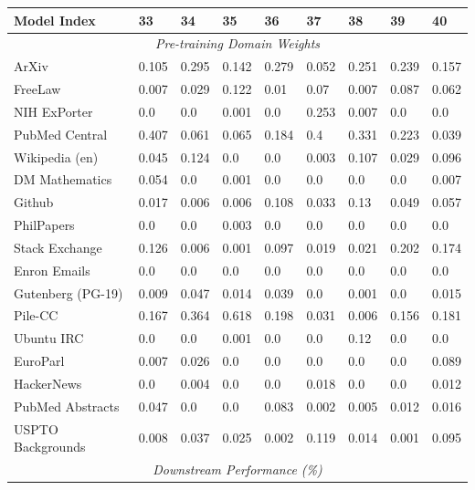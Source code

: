 \begin{table}[!ht]
    \centering
    \begin{tabular}{lllllllll}
    \toprule
        \textbf{Model Index} & \textbf{33} & \textbf{34} & \textbf{35} & \textbf{36} & \textbf{37} & \textbf{38} & \textbf{39} & \textbf{40} \\ \midrule
        \multicolumn{9}{c}{\textit{Pre-training Domain Weights}} \\
        ArXiv & 0.105 & 0.295 & 0.142 & 0.279 & 0.052 & 0.251 & 0.239 & 0.157 \\ 
        FreeLaw & 0.007 & 0.029 & 0.122 & 0.01 & 0.07 & 0.007 & 0.087 & 0.062 \\ 
        NIH ExPorter & 0.0 & 0.0 & 0.001 & 0.0 & 0.253 & 0.007 & 0.0 & 0.0 \\ 
        PubMed Central & 0.407 & 0.061 & 0.065 & 0.184 & 0.4 & 0.331 & 0.223 & 0.039 \\ 
        Wikipedia (en) & 0.045 & 0.124 & 0.0 & 0.0 & 0.003 & 0.107 & 0.029 & 0.096 \\ 
        DM Mathematics & 0.054 & 0.0 & 0.001 & 0.0 & 0.0 & 0.0 & 0.0 & 0.007 \\ 
        Github & 0.017 & 0.006 & 0.006 & 0.108 & 0.033 & 0.13 & 0.049 & 0.057 \\ 
        PhilPapers & 0.0 & 0.0 & 0.003 & 0.0 & 0.0 & 0.0 & 0.0 & 0.0 \\ 
        Stack Exchange & 0.126 & 0.006 & 0.001 & 0.097 & 0.019 & 0.021 & 0.202 & 0.174 \\ 
        Enron Emails & 0.0 & 0.0 & 0.0 & 0.0 & 0.0 & 0.0 & 0.0 & 0.0 \\ 
        Gutenberg (PG-19) & 0.009 & 0.047 & 0.014 & 0.039 & 0.0 & 0.001 & 0.0 & 0.015 \\ 
        Pile-CC & 0.167 & 0.364 & 0.618 & 0.198 & 0.031 & 0.006 & 0.156 & 0.181 \\ 
        Ubuntu IRC & 0.0 & 0.0 & 0.001 & 0.0 & 0.0 & 0.12 & 0.0 & 0.0 \\ 
        EuroParl & 0.007 & 0.026 & 0.0 & 0.0 & 0.0 & 0.0 & 0.0 & 0.089 \\ 
        HackerNews & 0.0 & 0.004 & 0.0 & 0.0 & 0.018 & 0.0 & 0.0 & 0.012 \\ 
        PubMed Abstracts & 0.047 & 0.0 & 0.0 & 0.083 & 0.002 & 0.005 & 0.012 & 0.016 \\ 
        USPTO Backgrounds & 0.008 & 0.037 & 0.025 & 0.002 & 0.119 & 0.014 & 0.001 & 0.095 \\ 
        \midrule
        \multicolumn{9}{c}{\textit{Downstream Performance (\%)}} \\

\end{tabular}
\end{table}
